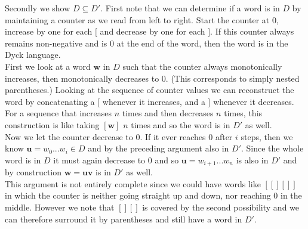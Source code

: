 \documentclass[defaultpackages]{simplereport}
\begin{document}
\begin{itemize}[label=]
  Secondly we show $D \subseteq D'$. First note that we can determine if a word
  is in $D$ by maintaining a counter as we read from left to right. Start the
  counter at 0, increase by one for each $[$ and decrease by one for each $]$.
  If this counter always remains non-negative and is 0 at the end of the word,
  then the word is in the Dyck language.
  \\
  First we look at a word $\mathbf{w}$ in $D$ such that the counter always
  monotonically increases, then monotonically decreases to 0. (This corresponds to
  simply nested parentheses.)
  Looking at the sequence of counter values we can reconstruct the word by
  concatenating a $[$ whenever it increases, and a $]$ whenever it decreases.
  For a  sequence that increases $n$ times and then decreases $n$ times, this
  construction is like taking $[\mathbf{w}]$ $n$ times and so the word is in
  $D'$ as well.\\

  Now we let the counter decrease to 0. If it ever reaches 0 after $i$ steps,
  then we know $\mathbf{u} = w_0...w_i \in D$ and by the preceding argument also in $D'$.
  Since the whole word is in $D$ it must again decrease to 0 and so $\mathbf{u}
  = w_{i+1}...w_n$ is also in $D'$ and by construction $\mathbf{w} =
  \mathbf{uv}$ is in $D'$ as well.\\

  This argument is not entirely complete since we could have words like $[[][]]$
  in which the counter is neither going straight up and down, nor reaching 0 in
  the middle. However we note that $[][]$ is covered by the second possibility
  and we can therefore surround it by parentheses and still have a word in $D'$.
\end{itemize}
\end{document}
